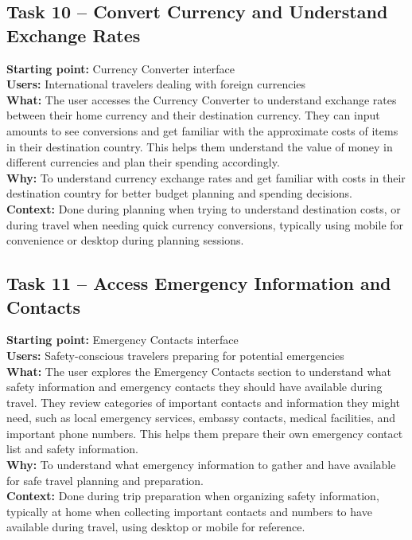 \documentclass[11pt,a4paper]{article}
\begin{document}
\subsection*{Task 10 – Convert Currency and Understand Exchange Rates}
\textbf{Starting point:} Currency Converter interface \\
\textbf{Users:} International travelers dealing with foreign currencies \\
\textbf{What:} The user accesses the Currency Converter to understand exchange rates between their home currency and their destination currency. They can input amounts to see conversions and get familiar with the approximate costs of items in their destination country. This helps them understand the value of money in different currencies and plan their spending accordingly. \\
\textbf{Why:} To understand currency exchange rates and get familiar with costs in their destination country for better budget planning and spending decisions. \\
\textbf{Context:} Done during planning when trying to understand destination costs, or during travel when needing quick currency conversions, typically using mobile for convenience or desktop during planning sessions.

\subsection*{Task 11 – Access Emergency Information and Contacts}
\textbf{Starting point:} Emergency Contacts interface \\
\textbf{Users:} Safety-conscious travelers preparing for potential emergencies \\
\textbf{What:} The user explores the Emergency Contacts section to understand what safety information and emergency contacts they should have available during travel. They review categories of important contacts and information they might need, such as local emergency services, embassy contacts, medical facilities, and important phone numbers. This helps them prepare their own emergency contact list and safety information. \\
\textbf{Why:} To understand what emergency information to gather and have available for safe travel planning and preparation. \\
\textbf{Context:} Done during trip preparation when organizing safety information, typically at home when collecting important contacts and numbers to have available during travel, using desktop or mobile for reference.
\end{document}
